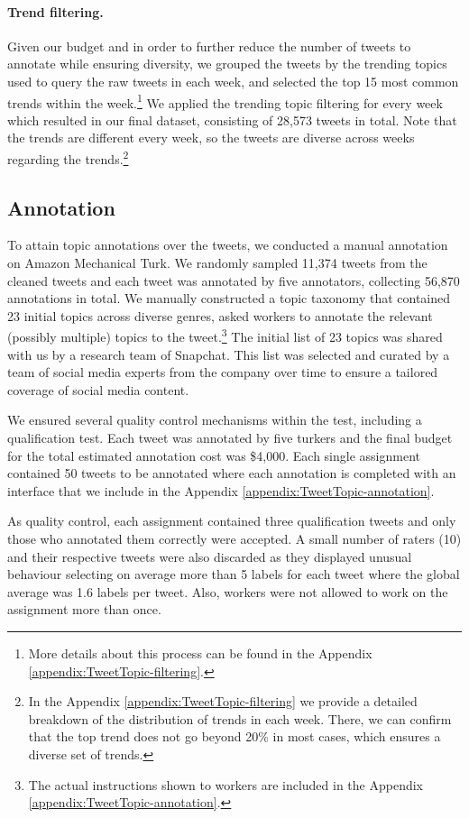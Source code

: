 \paragraph{Trend filtering.}

Given our budget and in order to further reduce the number of tweets to annotate while ensuring diversity, we grouped the tweets by the trending topics used to query the raw tweets in each week, and selected the top 15 most common trends within the week.\footnote{More details about this process can be found in the Appendix \ref{appendix:TweetTopic-filtering}.} 
We applied the trending topic filtering for every week which resulted in our final dataset, consisting of 28,573 tweets in total. 
Note that the trends are different every week, so the tweets are diverse across weeks regarding the trends.\footnote{In the Appendix \ref{appendix:TweetTopic-filtering} we provide a detailed breakdown of the distribution of trends in each week. There, we can confirm that the top trend does not go beyond 20\% in most cases, which ensures a diverse set of trends.
} 

\subsection{Annotation}
To attain topic annotations over the tweets, we conducted a manual annotation on Amazon Mechanical Turk.
We randomly sampled 11,374 tweets from the cleaned tweets and each tweet was annotated by five annotators, collecting 56,870 annotations in total. 
We manually constructed a topic taxonomy that contained 23 initial topics across diverse genres, asked workers to annotate the relevant (possibly multiple) topics to the tweet.\footnote{The actual instructions shown to workers are included in the Appendix \ref{appendix:TweetTopic-annotation}.} The initial list of 23 topics was shared with us by a research team of Snapchat. This list was selected and curated by a team of social media experts from the company over time to ensure a tailored coverage of social media content. 

We ensured several quality control mechanisms within the test, including a qualification test. Each tweet was annotated by five turkers and the final budget for the total estimated annotation cost was \$4,000.
Each single assignment contained 50 tweets to be annotated where each annotation is completed with an interface that we include in the Appendix \ref{appendix:TweetTopic-annotation}. 

As quality control, each assignment contained three qualification tweets and only those who annotated them correctly were accepted.
A small number of raters (10) and their respective tweets were also discarded as they displayed unusual behaviour selecting on average more than 5 labels for each tweet where the global average was 1.6 labels per tweet.
Also, workers were not allowed to work on the assignment more than once.

